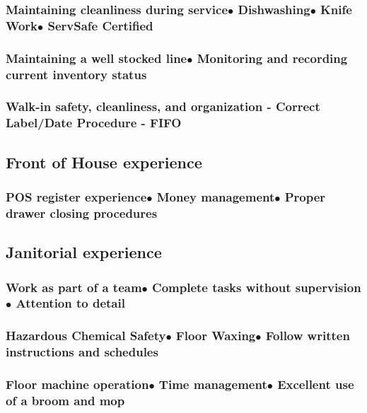 \documentclass{article}
\begin{document}
\subsubsection{Maintaining cleanliness during service\hfill$\bullet$ Dishwashing\hfill$\bullet$ Knife Work\hfill$\bullet$ ServSafe Certified}



\subsubsection{Maintaining a well stocked line\hfill$\bullet$ Monitoring and recording current inventory status}

\subsubsection{Walk-in safety, cleanliness, and organization - Correct Label/Date Procedure - FIFO}


\subsection{Front of House experience}

\subsubsection{POS register experience\hfill$\bullet$ Money management\hfill$\bullet$ Proper drawer closing procedures}

\subsection{Janitorial experience}

\subsubsection{Work as part of a team\hfill$\bullet$ Complete tasks without supervision\hfill$\bullet$ Attention to detail}

\subsubsection{Hazardous Chemical Safety\hfill$\bullet$ Floor Waxing\hfill$\bullet$ Follow written instructions and schedules}

\subsubsection{Floor machine operation\hfill$\bullet$ Time management\hfill$\bullet$ Excellent use of a broom and mop}
\end{document}
